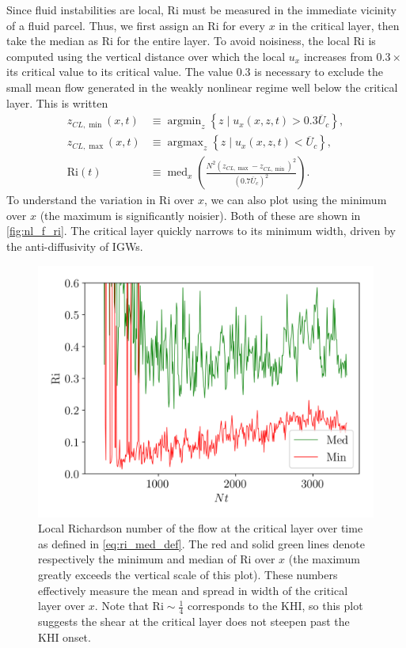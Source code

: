 \documentclass[
        fleqn,
        usenatbib,
        referee,
    ]{mnras}
\newcommand*{\p}[1]{\left(#1\right)}
\newcommand*{\z}[1]{\left\{#1\right\}}
\DeclareMathOperator*{\argmin}{argmin}
\DeclareMathOperator*{\argmax}{argmax}
\DeclareMathOperator*{\med}{med}
\begin{document}
Since fluid instabilities are local, $\mathrm{Ri}$ must be measured in the
immediate vicinity of a fluid parcel. Thus, we first assign an $\mathrm{Ri}$ for
every $x$ in the critical layer, then take the median as $\mathrm{Ri}$ for the
entire layer. To avoid noisiness, the local $\mathrm{Ri}$ is computed using the
vertical distance over which the local $u_x$ increases from $0.3 \times$ its
critical value to its critical value. The value $0.3$ is necessary to exclude
the small mean flow generated in the weakly nonlinear regime well below the
critical layer. This is written
\begin{align}
    z_{CL, \min}(x, t) &\equiv \argmin_z
        \z{z\mid u_x(x, z, t) > 0.3\overline{U}_c},\\
    z_{CL, \max}(x, t) &\equiv \argmax_z
        \z{z\mid u_x(x, z, t) < \overline{U}_c},\\
    \mathrm{Ri}(t) &\equiv
        \med_x\p{\frac{N^2 \p{z_{CL, \max} - z_{CL, \min}}^2}{(0.7
            \overline{U}_c)^2}}.\label{eq:ri_med_def}
\end{align}
To understand the variation in $\mathrm{Ri}$ over $x$, we can also plot using
the minimum over $x$ (the maximum is significantly noisier). Both of these are
shown in \autoref{fig:nl_f_ri}. The critical layer quickly narrows to its
minimum width, driven by the anti-diffusivity of IGWs.
\begin{figure}
    \centering
    \includegraphics[width=0.6\columnwidth]{plots/nl_f_ri.png}
    \caption{Local Richardson number of the flow at the critical layer over time
    as defined in \autoref{eq:ri_med_def}. The red and solid green lines denote
    respectively the minimum and median of $\mathrm{Ri}$ over $x$ (the maximum
    greatly exceeds the vertical scale of this plot). These numbers effectively
    measure the mean and spread in width of the critical layer over $x$. Note
    that $\mathrm{Ri} \sim \frac{1}{4}$ corresponds to the KHI, so this plot
    suggests the shear at the critical layer does not steepen past the KHI
    onset.}\label{fig:nl_f_ri}
\end{figure}
\end{document}
